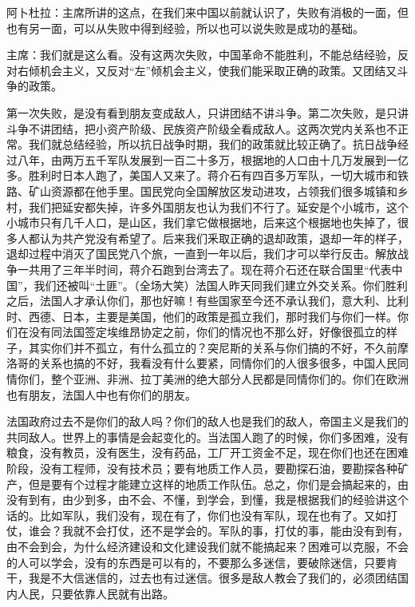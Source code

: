阿卜杜拉：主席所讲的这点，在我们来中国以前就认识了，失败有消极的一面，但也有另一面，可以从失败中得到经验，所以也可以说失败是成功的基础。

主席：我们就是这么看。没有这两次失败，中国革命不能胜利，不能总结经验，反对右倾机会主义，又反对“左”倾机会主义，使我们能采取正确的政策。又团结又斗争的政策。

第一次失败，是没有看到朋友变成敌人，只讲团结不讲斗争。第二次失败，是只讲斗争不讲团结，把小资产阶级、民族资产阶级全看成敌人。这两次党内关系也不正常。我们就总结经验，所以抗日战争时期，我们的政策就比较正确了。抗日战争经过八年，由两万五千军队发展到一百二十多万，根据地的人口由十几万发展到一亿多。胜利时日本人跑了，美国人又来了。蒋介石有四百多万军队，一切大城市和铁路、矿山资源都在他手里。国民党向全国解放区发动进攻，占领我们很多城镇和乡村，我们把延安都失掉，许多外国朋友也认为我们不行了。延安是个小城市，这个小城市只有几千人口，是山区，我们拿它做根据地，后来这个根据地也失掉了，很多人都认为共产党没有希望了。后来我们釆取正确的退却政策，退却一年的样子，退却过程中消灭了国民党八个旅，一直到一年以后，我们才可以举行反击。解放战争一共用了三年半时间，蒋介石跑到台湾去了。现在蒋介石还在联合国里“代表中国”，我们还被叫“土匪”。（全场大笑）法国人昨天同我们建立外交关系。你们胜利之后，法国人才承认你们，那也好嘛！有些国家至今还不承认我们，意大利、比利时、西德、日本，主要是美国，他们的政策是孤立我们，那时我们与你们一样。你们在没有同法国签定埃维昂协定之前，你们的情况也不那么好，好像很孤立的样子，其实你们并不孤立，有什么孤立的？突尼斯的关系与你们搞的不好，不久前摩洛哥的关系也搞的不好，我看没有什么要紧，同情你们的人很多很多，中国人民同情你们，整个亚洲、非洲、拉丁美洲的绝大部分人民都是同情你们的。你们在欧洲也有朋友，法国人中也有你们的朋友。

法国政府过去不是你们的敌人吗？你们的敌人也是我们的敌人，帝国主义是我们的共同敌人。世界上的事情是会起变化的。当法国人跑了的时候，你们多困难，没有粮食，没有教员，没有医生，没有药品，工厂开工资金不足，现在你们也还在困难阶段，没有工程师，没有技术员；要有地质工作人员，要勘探石油，要勘探各种矿产，但是要有个过程才能建立这样的地质工作队伍。总之，你们是会搞起来的，由没有到有，由少到多，由不会、不懂，到学会，到懂，我是根据我们的经验讲这个话的。比如军队，我们没有，现在有了，你们也没有军队，现在也有了。又如打仗，谁会？我就不会打仗，还不是学会的。军队的事，打仗的事，能由没有到有，由不会到会，为什么经济建设和文化建设我们就不能搞起来？困难可以克服，不会的人可以学会，没有的东西是可以有的，不要那么多迷信，要破除迷信，只要肯干，我是不大信迷信的，过去也有过迷信。很多是敌人教会了我们的，必须团结国内人民，只要依靠人民就有出路。

